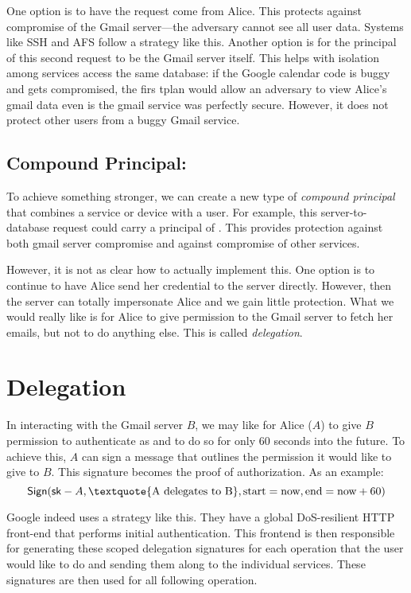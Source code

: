 One option is to have the request come from Alice. This protects against compromise of the Gmail server---the adversary cannot see all user data. Systems like SSH and AFS follow a strategy like this. Another option is for the principal of this second request to be the Gmail server itself. This helps with isolation among services access the same database: if the Google calendar code is buggy and gets compromised, the firs tplan would allow an adversary to view Alice's gmail data even is the gmail service was perfectly secure. However, it does not protect other users from a buggy Gmail service.

\subsection{Compound Principal: }
To achieve something stronger, we can create a new type of \emph{compound principal} that combines a service or device with a user. For example, this server-to-database request could carry a principal of . This provides protection against both gmail server compromise and against compromise of other services.

However, it is not as clear how to actually implement this. One option is to continue to have Alice send her credential to the server directly. However, then the server can totally impersonate Alice and we gain little protection. What we would really like is for Alice to give permission to the Gmail server to fetch her emails, but not to do anything else. This is called \emph{delegation}.

\section{Delegation}
In interacting with the Gmail server $B$, we may like for Alice ($A$) to give $B$ permission to authenticate as  and to do so for only 60 seconds into the future. To achieve this, $A$ can sign a message that outlines the permission it would like to give to $B$. This signature becomes the proof of authorization. As an example:
\[ \Sign(\sk-A, \text{\textquote{A delegates to B}}, \text{start}=\text{now}, \text{end}=\text{now}+60) \]

Google indeed uses a strategy like this. They have a global DoS-resilient HTTP front-end that performs initial authentication. This frontend is then responsible for generating these scoped delegation signatures for each operation that the user would like to do and sending them along to the individual services. These signatures are then used for all following operation.

